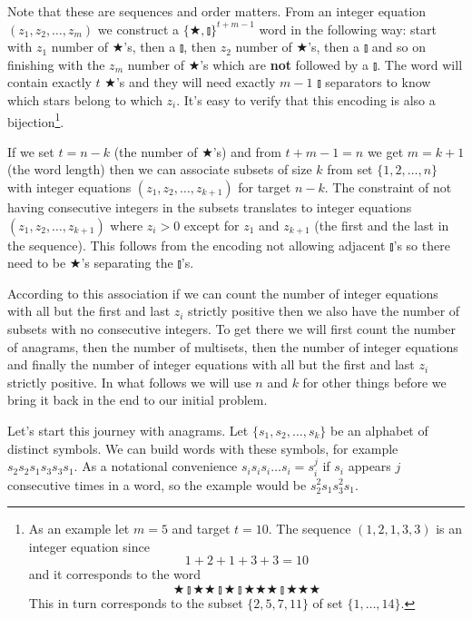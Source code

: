 Note that these are sequences and order matters. From an integer equation $(z_1, z_2, \ldots, z_m)$ we construct a $\{\bigstar, \talloblong\}^{t + m - 1}$ word in the following way: start with $z_1$ number of $\bigstar$'s, then a $\talloblong$, then $z_2$ number of $\bigstar$'s, then a $\talloblong$ and so on finishing with the $z_m$ number of $\bigstar$'s which are \textbf{not} followed by a $\talloblong$. The word will contain exactly $t$ $\bigstar$'s and they will need exactly $m - 1$ $\talloblong$ separators to know which stars belong to which $z_i$. It's easy to verify that this encoding is also a bijection\footnote{As an example let $m = 5$ and target $t = 10$. The sequence $(1, 2, 1, 3, 3)$ is an integer equation since 
$$
1 + 2 + 1 + 3 + 3 = 10
$$ 
and it corresponds to the word 
$$
\bigstar\talloblong\bigstar\bigstar\talloblong\bigstar\talloblong\bigstar\bigstar\bigstar\talloblong\bigstar\bigstar\bigstar
$$
This in turn corresponds to the subset $\{2, 5, 7, 11\}$ of set $\{1, \ldots, 14\}$.}.

\begin{lem}\label{consec_ints_association}
If we set $t = n - k$ (the number of $\bigstar$'s) and from $t + m - 1 = n$ we get $m = k + 1$ (the word length) then we can associate subsets of size $k$ from set $\{1, 2, \ldots, n\}$ with integer equations $(z_1, z_2, \ldots, z_{k + 1})$ for target $n - k$. The constraint of not having consecutive integers in the subsets translates to integer equations $(z_1, z_2, \ldots, z_{k + 1})$ where $z_i > 0$ except for $z_1$ and $z_{k + 1}$ (the first and the last in the sequence). This follows from the encoding not allowing adjacent $\talloblong$'s so there need to be $\bigstar$'s separating the $\talloblong$'s.
\end{lem}

According to this association if we can count the number of integer equations with all but the first and last $z_i$ strictly positive then we also have the number of subsets with no consecutive integers. To get there we will first count the number of anagrams, then the number of multisets, then the number of integer equations and finally the number of integer equations with all but the first and last $z_i$ strictly positive. In what follows we will use $n$ and $k$ for other things before we bring it back in the end to our initial problem.

Let's start this journey with anagrams. Let $\{s_1, s_2, \ldots, s_k\}$ be an alphabet of distinct symbols. We can build words with these symbols, for example $s_2s_2s_1s_3s_3s_1$. As a notational convenience $s_is_is_i \ldots s_i=s_i^j$ if $s_i$ appears $j$ consecutive times in a word, so the example would be $s_2^2s_1s_3^2s_1$.

